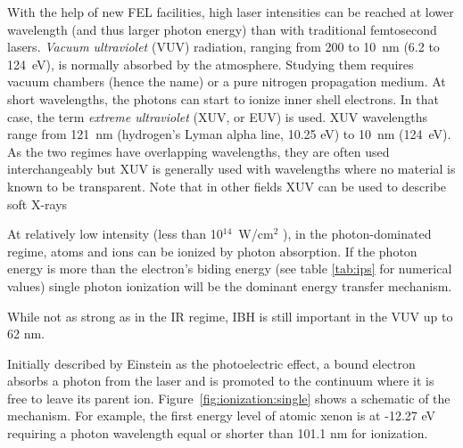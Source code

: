 
With the help of new FEL facilities, high laser intensities can be reached at
lower wavelength (and thus larger photon energy) than with traditional
femtosecond lasers. \textit{Vacuum ultraviolet} (VUV) radiation, ranging from 200 to
10~nm (6.2 to 124~eV), is normally absorbed by the atmosphere. Studying them
requires vacuum chambers (hence the name) or a pure nitrogen propagation medium.
At short wavelengths, the photons can start to ionize inner shell electrons. In
that case, the term \textit{extreme ultraviolet} (XUV, or EUV) is used. XUV wavelengths
range from 121~nm (hydrogen's Lyman alpha line, 10.25 eV) to 10~nm (124~eV).
As the two regimes have overlapping wavelengths, they are often used
interchangeably but XUV is generally used with wavelengths where no
material is known to be transparent\cite{Laane2009}. Note that in other fields
XUV can be used to describe soft X-rays\cite{Eichmeier2008,iso21348}

At relatively low intensity (less than 10$^{14}$~W/cm$^2$
\cite{Ramunno2008}), in the photon-dominated regime, atoms and ions
can be ionized by photon absorption. If the photon energy is more than the
electron's biding energy (see table \ref{tab:ips} for numerical values) single
photon ionization will be the dominant energy transfer mechanism.

While not as strong as in the IR regime, IBH is still important in the
VUV\cite{Krainov2000} up to 62 nm\cite{Georgescu2007}.



Initially described by Einstein as the photoelectric effect, a bound electron
absorbs a photon from the laser and is promoted to the continuum where it is
free to leave its parent ion. Figure~\ref{fig:ionization:single} shows a
schematic of the mechanism. For example, the first energy level of atomic
xenon is at -12.27 eV requiring a photon wavelength equal or shorter than
101.1 nm for ionization.


